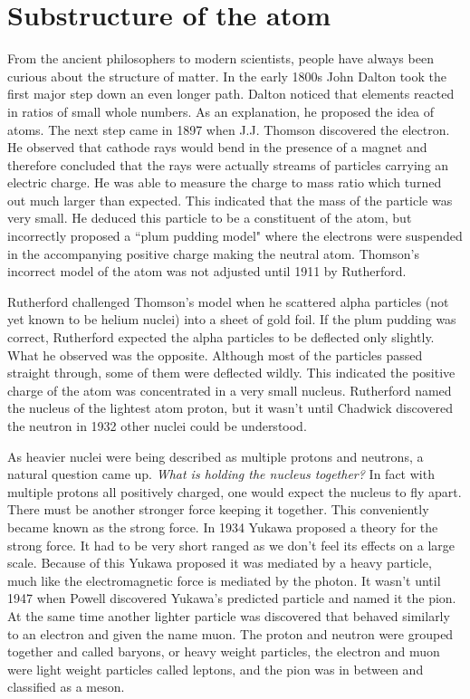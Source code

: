 \documentclass[letterpaper, abstract = on,listof=totoc, bibliography=totoc]{scrreprt}
\begin{document}
\section{Substructure of the atom}

From the ancient philosophers to modern scientists, people have always been curious about the structure of matter. In the early 1800s John Dalton took the first major step down an even longer path. Dalton noticed that elements reacted in ratios of small whole numbers. As an explanation, he proposed the idea of atoms. The next step came in 1897 when J.J. Thomson discovered the electron. He observed that cathode rays would bend in the presence of a magnet and therefore concluded that the rays were actually streams of particles carrying an electric charge. He was able to measure the charge to mass ratio which turned out much larger than expected. This indicated that the mass of the particle was very small. He deduced this particle to be a constituent of the atom, but incorrectly proposed a ``plum pudding model" where the electrons were suspended in the accompanying positive charge making the neutral atom. Thomson's incorrect model of the atom was not adjusted until 1911 by Rutherford.

Rutherford challenged Thomson's model when he scattered alpha particles (not yet known to be helium nuclei) into a sheet of gold foil. If the plum pudding was correct, Rutherford expected the alpha particles to be deflected only slightly. What he observed was the opposite. Although most of the particles passed straight through, some of them were deflected wildly. This indicated the positive charge of the atom was concentrated in a very small nucleus. Rutherford named the nucleus of the lightest atom proton, but it wasn't until Chadwick discovered the neutron in 1932 other nuclei could be understood.\cite{IEP}

As heavier nuclei were being described as multiple protons and neutrons, a natural question came up. \textit{What is holding the nucleus together?} In fact with multiple protons all positively charged, one would expect the nucleus to fly apart. There must be another stronger force keeping it together. This conveniently became known as the strong force. In 1934 Yukawa proposed a theory for the strong force. It had to be very short ranged as we don't feel its effects on a large scale. Because of this Yukawa proposed it was mediated by a heavy particle, much like the electromagnetic force is mediated by the photon.  It wasn't until 1947 when Powell discovered Yukawa's predicted particle and named it the pion. At the same time another lighter particle was discovered that behaved similarly to an electron and given the name muon. The proton and neutron were grouped together and called baryons, or heavy weight particles, the electron and muon were light weight particles called leptons, and the pion was in between and classified as a meson.\cite{IEP}  
\end{document}
